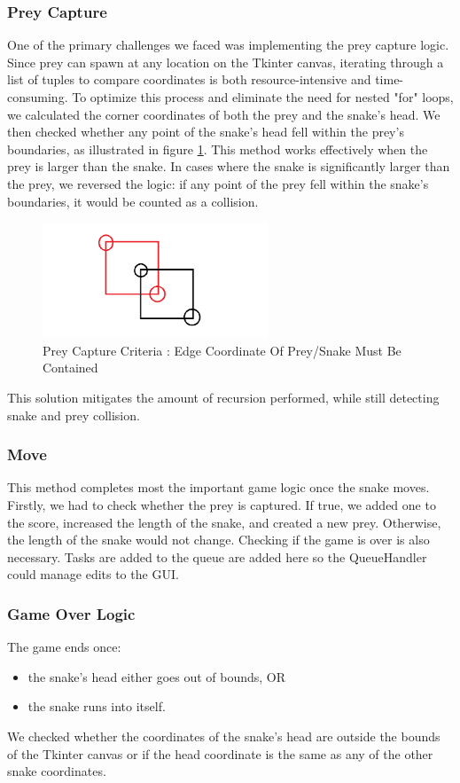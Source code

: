 \documentclass{article}
\begin{document}
\subsubsection{Prey Capture}
One of the primary challenges we faced was implementing the prey capture logic. Since prey can spawn at any location on the Tkinter canvas, iterating through a list of tuples to compare coordinates is both resource-intensive and time-consuming. To optimize this process and eliminate the need for nested "for" loops, we calculated the corner coordinates of both the prey and the snake's head. We then checked whether any point of the snake's head fell within the prey's boundaries, as illustrated in figure \ref{fig:PreyCapture}. This method works effectively when the prey is larger than the snake. In cases where the snake is significantly larger than the prey, we reversed the logic: if any point of the prey fell within the snake's boundaries, it would be counted as a collision.
\begin{figure}[H]
   \centering
    \includegraphics[width=0.6\textwidth]{PreyCapture.png}
    \caption{Prey Capture Criteria : Edge Coordinate Of Prey/Snake Must Be Contained}
    \label{fig:PreyCapture}
\end{figure}

This solution mitigates the amount of recursion performed, while still detecting snake and prey collision.
\subsubsection{Move}
This method completes most the important game logic once the snake moves. Firstly, we had to check whether the prey is captured. If true, we added one to the score, increased the length of the snake, and created a new prey. Otherwise, the length of the snake would not change. Checking if the game is over is also necessary. Tasks are added to the queue are added here so the QueueHandler could manage edits to the GUI.
\subsubsection{Game Over Logic}
The game ends once:
\begin{itemize}
    \item the snake's head either goes out of bounds, OR
    \item the snake runs into itself.
\end{itemize}
We checked whether the coordinates of the snake's head are outside the bounds of the Tkinter canvas or if the head coordinate is the same as any of the other snake coordinates.
\end{document}

